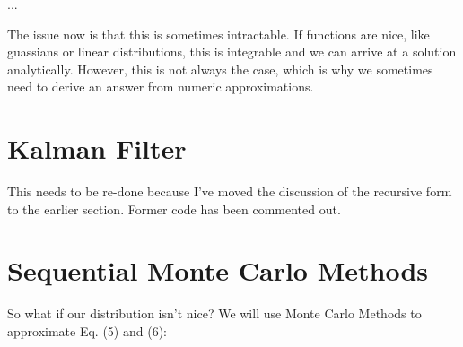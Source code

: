 \documentclass{article}
\begin{document}
...

The issue now is that this is sometimes intractable. If functions are nice, like guassians or linear distributions, this is integrable and we can arrive at a solution analytically. However, this is not always the case, which is why we sometimes need to derive an answer from numeric approximations.

\section{Kalman Filter}

This needs to be re-done because I've moved the discussion of the recursive form to the earlier section. Former code has been commented out.




\section{Sequential Monte Carlo Methods}

So what if our distribution isn't nice? We will use Monte Carlo Methods to approximate Eq. (5) and (6):
\end{document}
